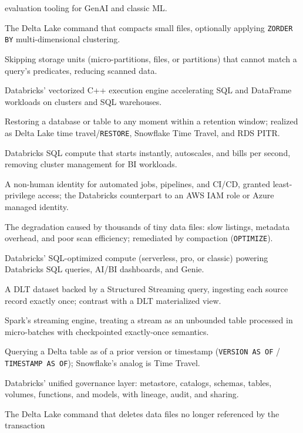 \begin{description}
    evaluation tooling for GenAI and classic ML.
  \item[OPTIMIZE] The Delta Lake command that compacts small files, optionally applying
    \texttt{ZORDER BY} multi-dimensional clustering.
  \item[Partition pruning] Skipping storage units (micro-partitions, files, or partitions) that cannot
    match a query's predicates, reducing scanned data.
  \item[Photon] Databricks' vectorized C++ execution engine accelerating SQL and DataFrame workloads
    on clusters and SQL warehouses.
  \item[Point-in-time recovery (PITR)] Restoring a database or table to any moment within a retention
    window; realized as Delta Lake time travel/\texttt{RESTORE}, Snowflake Time Travel, and RDS PITR.
  \item[Serverless SQL warehouse] Databricks SQL compute that starts instantly, autoscales, and bills
    per second, removing cluster management for BI workloads.
  \item[Service principal] A non-human identity for automated jobs, pipelines, and CI/CD, granted
    least-privilege access; the Databricks counterpart to an AWS IAM role or Azure managed identity.
  \item[Small-file problem] The degradation caused by thousands of tiny data files: slow listings,
    metadata overhead, and poor scan efficiency; remediated by compaction (\texttt{OPTIMIZE}).
  \item[SQL warehouse] Databricks' SQL-optimized compute (serverless, pro, or classic) powering
    Databricks SQL queries, AI/BI dashboards, and Genie.
  \item[Streaming table] A DLT dataset backed by a Structured Streaming query, ingesting each source
    record exactly once; contrast with a DLT materialized view.
  \item[Structured Streaming] Spark's streaming engine, treating a stream as an unbounded table
    processed in micro-batches with checkpointed exactly-once semantics.
  \item[Time travel] Querying a Delta table as of a prior version or timestamp
    (\texttt{VERSION AS OF} / \texttt{TIMESTAMP AS OF}); Snowflake's analog is Time Travel.
  \item[Unity Catalog] Databricks' unified governance layer: metastore, catalogs, schemas, tables,
    volumes, functions, and models, with lineage, audit, and sharing.
  \item[VACUUM] The Delta Lake command that deletes data files no longer referenced by the transaction

\end{description}
